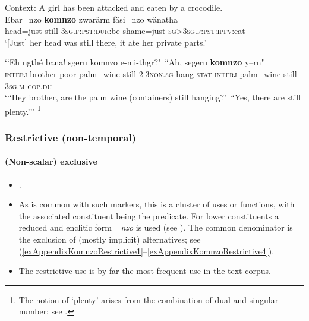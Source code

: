 \begin{exe}

	\ex \label{exAppendixKomnzoDecrementHead}
	 Context: A girl has been attacked and eaten by a crocodile.\\
	 \gll Ebar=nzo \textbf{komnzo} zwarärm fäsi=nzo wänatha\\
	head=just still 3\textsc{sg}.\textsc{f}:\textsc{pst}:\textsc{dur}:be shame=just \textsc{sg}>3\textsc{sg}.\textsc{f}:\textsc{pst}:\textsc{ipfv}:eat\\ 
	\glt \lq [Just] her head was still there, it ate her private parts.' \parencite{Doehler2020}

	\ex \label{exAppendixKomnzoDecrementPalmWine}
	\gll \lq\lq Eh ngthé bana! sgeru komnzo e-mi-thgr?" \lq\lq Ah, segeru \textbf{komnzo} y–rn"\\
	\phantom{\lq\lq}\textsc{interj} brother poor palm\_wine still 2|3\textsc{non.sg}-hang-\textsc{stat} \phantom{\lq\lq}\textsc{interj} palm\_wine still 3\textsc{sg}.\textsc{m}-\textsc{cop.du}\\
	\glt \lq {\lq\lq}Hey brother, are the palm wine (containers) still hanging?" \lq\lq Yes, there are still plenty.{\rq\rq}\rq{ }\parencite[220]{Doehler2018}\footnote{The notion of \lq plenty' arises from the combination of dual and singular number; see \textcite[219]{Doehler2018}.}
	
\end{exe}

\subsubsection{Restrictive (non-temporal)}
\paragraph{(Non-scalar) exclusive}
\label{appendixKomnzoRestrictive}

\begin{itemize}
	\item \textcite[125–126]{Doehler2018}.
	\item As is common with such markers, this is a cluster of uses or functions, with the associated constituent being the predicate. For lower constituents a reduced and enclitic form =\textit{nzo} is used (see \cite[169–170]{Doehler2018}). The common denominator is the exclusion of (mostly implicit) alternatives; see (\ref{exAppendixKomnzoRestrictive1}–\ref{exAppendixKomnzoRestrictive4}). 
	\item The restrictive use is by far the most frequent use in the text corpus.
\end{itemize}

